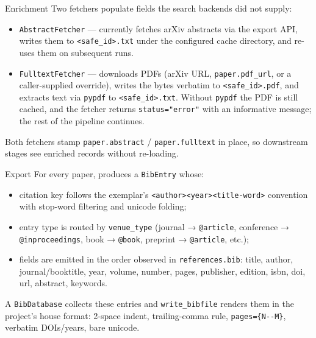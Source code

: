 \documentclass[
  ignorenonframetext,
]{beamer}
\providecommand{\tightlist}{%
  \setlength{\itemsep}{0pt}\setlength{\parskip}{0pt}}
\begin{document}
\begin{frame}{Enrichment}
\protect{}\label{enrichment}
Two fetchers populate fields the search backends did not supply:

\begin{itemize}
\tightlist
\item
  \texttt{AbstractFetcher} --- currently fetches arXiv abstracts via the
  export API, writes them to
  \texttt{\textless{}safe\_id\textgreater{}.txt} under the configured
  cache directory, and re-uses them on subsequent runs.
\item
  \texttt{FulltextFetcher} --- downloads PDFs (arXiv URL,
  \texttt{paper.pdf\_url}, or a caller-supplied override), writes the
  bytes verbatim to \texttt{\textless{}safe\_id\textgreater{}.pdf}, and
  extracts text via \texttt{pypdf} to
  \texttt{\textless{}safe\_id\textgreater{}.txt}. Without \texttt{pypdf}
  the PDF is still cached, and the fetcher returns
  \texttt{status="error"} with an informative message; the rest of the
  pipeline continues.
\end{itemize}

Both fetchers stamp \texttt{paper.abstract} / \texttt{paper.fulltext} in
place, so downstream stages see enriched records without re-loading.
\end{frame}

\begin{frame}{Export}
\protect{}\label{export}
For every paper,  produces a
\texttt{BibEntry} whose:

\begin{itemize}
\tightlist
\item
  citation key follows the exemplar's
  \texttt{\textless{}author\textgreater{}\textless{}year\textgreater{}\textless{}title-word\textgreater{}}
  convention with stop-word filtering and unicode folding;
\item
  entry type is routed by \texttt{venue\_type} (journal →
  \texttt{@article}, conference → \texttt{@inproceedings}, book →
  \texttt{@book}, preprint → \texttt{@article}, etc.);
\item
  fields are emitted in the order observed in \texttt{references.bib}:
  title, author, journal/booktitle, year, volume, number, pages,
  publisher, edition, isbn, doi, url, abstract, keywords.
\end{itemize}

A \texttt{BibDatabase} collects these entries and
\texttt{write\_bibfile} renders them in the project's house format:
2-space indent, trailing-comma rule, \texttt{pages=\{N-\/-M\}}, verbatim
DOIs/years, bare unicode.
\end{frame}
\end{document}
